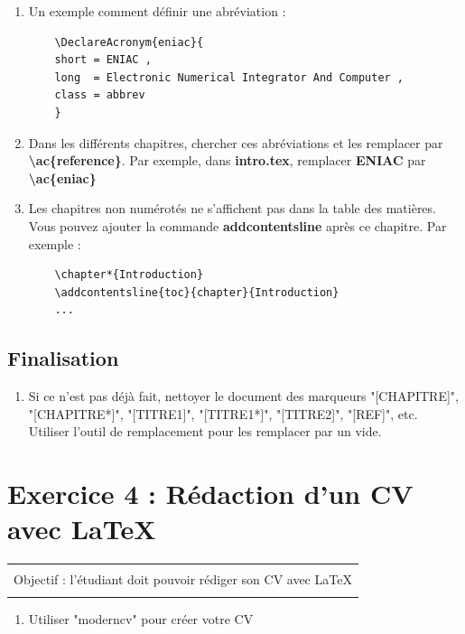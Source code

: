 \documentclass[11pt, a4paper]{article}
\begin{document}
\begin{enumerate}
	\item Un exemple comment définir une abréviation : 
	\begin{verbatim}
	\DeclareAcronym{eniac}{
	short = ENIAC ,
	long  = Electronic Numerical Integrator And Computer ,
	class = abbrev
	}
	\end{verbatim} 
	
	\item Dans les différents chapitres, chercher ces abréviations et les remplacer par \textbf{\textbackslash ac\{reference\}}. Par exemple, dans \textbf{intro.tex}, remplacer \textbf{ENIAC} par \textbf{\textbackslash ac\{eniac\}}
	
	\item Les chapitres non numérotés ne s'affichent pas dans la table des matières. Vous pouvez ajouter la commande \textbf{addcontentsline} après ce chapitre. Par exemple : 
	\begin{verbatim}
	\chapter*{Introduction}
	\addcontentsline{toc}{chapter}{Introduction}
	...
	\end{verbatim} 
	
	
\end{enumerate}

\subsection*{Finalisation}

\begin{enumerate}
	\item Si ce n'est pas déjà fait, nettoyer le document des marqueurs "[CHAPITRE]", "[CHAPITRE*]", "[TITRE1]", "[TITRE1*]", "[TITRE2]", "[REF]", etc. Utiliser l'outil de remplacement pour les remplacer par un vide. 
\end{enumerate}

\section*{Exercice 4 : Rédaction d'un CV avec \LaTeX}

\vspace{-12pt}
\begin{tabular}{|p{\textwidth}|}
	\hline\\
	Objectif : l'étudiant doit pouvoir rédiger son CV avec \LaTeX \\\\
	\hline
\end{tabular}

\begin{enumerate}
	\item Utiliser "moderncv" pour créer votre CV
\end{enumerate}
\end{document}
